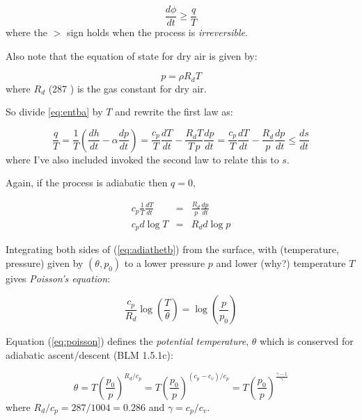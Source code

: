 \documentclass[12pt]{article}
\begin{document}
\begin{equation}
  \label{eq:second}
  \frac{d\phi}{dt} \geq \frac{q}{T}
\end{equation}
where the $>$ sign holds when the process is \textit{irreversible}.

Also note that the equation of state for dry air is given by:

\begin{equation}
  \label{eq:eos}
  p = \rho R_d T
\end{equation}
where $R_d$ (287 \jkgk) is the gas constant for dry air.

So divide \eqref{eq:entba} by $T$ and  rewrite the first law  as:

\begin{equation}
  \label{eq:poten1}
  \frac{q}{T}  = \frac{1}{T} \left ( \frac{dh}{dt} - \alpha \frac{dp}{dt} \right ) =  
    \frac{c_p}{T} \frac{dT}{dt} - \frac{R_d T}{T\, p} \frac{dp}{dt} = 
    \frac{c_p}{T} \frac{dT}{dt} - \frac{R_d }{ p} \frac{dp}{dt} \leq \frac{ds}{dt}
\end{equation}
where I've also included invoked the second law to relate this to $s$.

Again, if the process is  adiabatic then $q=0$, 

\begin{subequations}
\begin{eqnarray}
  \label{eq:adiathet}
  c_p \frac{1}{T} \frac{dT}{dt} &=& \frac{R_d}{p} \frac{dp}{dt}\\
  c_p  d\log{T} &=& R_d d \log {p}\label{eq:adiathetb}
\end{eqnarray}
\end{subequations}

 Integrating both sides of (\ref{eq:adiathetb}) from the
surface, with (temperature, pressure) given by $(\theta, p_0)$
to a lower pressure $p$ and lower (why?) temperature $T$
gives  \textit{Poisson's equation}:

\begin{equation}
  \label{eq:poisson}
  \frac{c_p}{R_d} \log \left ( \frac{T}{\theta} \right ) = \log \left ( \frac{p}{p_0} \right )
\end{equation}

Equation (\ref{eq:poisson}) defines the \textit{potential temperature}, $\theta$
which is conserved for adiabatic ascent/descent  (BLM 1.5.1c):

\begin{equation}
  \label{eq:pottemp}
  \theta =  T \left ( \frac{p_0}{p} \right )^{R_d/c_p} =
 T \left ( \frac{p_0}{p} \right )^{(c_p - c_v)/c_p} =  
 T \left ( \frac{p_0}{p} \right )^{\frac{\gamma - 1}{\gamma}} 
\end{equation}
where $R_d/c_p = 287/1004 =0.286$ and $\gamma = c_p/c_v$.  
\end{document}
